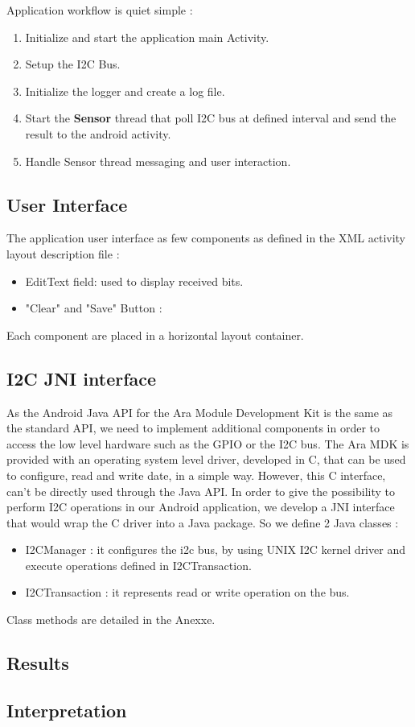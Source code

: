 Application workflow is quiet simple :
\begin{enumerate}
\item Initialize and start the application main Activity.
\item Setup the I2C Bus.
\item Initialize the logger and create a log file.
\item Start the \textbf{Sensor} thread that poll I2C bus at defined interval and send the result to the android activity. 
\item Handle Sensor thread messaging and user interaction.
\end{enumerate}

\subsection{User Interface}

The application user interface as few components as defined in the XML activity layout description file :
\begin{itemize}
\item EditText field: used to display received bits.
\item "Clear" and "Save" Button :
\end{itemize}

Each component are placed in a horizontal layout container.

\subsection{I2C JNI interface}

As the Android Java API for the Ara Module Development Kit is the same as the standard API, we need to implement additional components in order to access the low level hardware such as the GPIO or the I2C bus.
The Ara MDK is provided with an operating system level driver, developed in C, that can be used to configure, read and write date, in a simple way.
However, this C interface, can't be directly used through the Java API. In order to give the possibility to perform I2C operations in our Android application, we develop a JNI interface that would wrap the C driver into a Java package.
So we define 2 Java classes : 
\begin{itemize}
\item I2CManager : it configures the i2c bus, by using UNIX I2C kernel driver and execute operations defined in I2CTransaction.
\item I2CTransaction : it represents read or write operation on the bus.
\end{itemize}

Class methods are detailed in the Anexxe.

\subsection{Results}
\subsection{Interpretation}